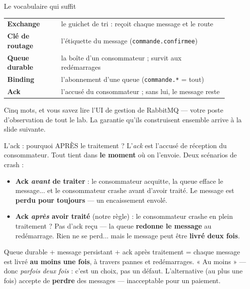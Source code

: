 \documentclass[aspectratio=169,11pt]{beamer}
\begin{document}
\begin{frame}{Le vocabulaire qui suffit}
{\small\begin{tabular}{p{0.22\linewidth}p{0.68\linewidth}}
\toprule
\textbf{Exchange} & le guichet de tri : reçoit chaque message et le route\\
\textbf{Clé de routage} & l'étiquette du message (\texttt{commande.confirmee})\\
\textbf{Queue durable} & la boîte d'un consommateur ; survit aux redémarrages\\
\textbf{Binding} & l'abonnement d'une queue (\texttt{commande.*} = tout)\\
\textbf{Ack} & l'accusé du consommateur ; sans lui, le message reste\\
\bottomrule
\end{tabular}}
\vskip4pt
\begin{ucadret}[À retenir]
{\small Cinq mots, et vous savez lire l'UI de gestion de RabbitMQ — votre poste d'observation de tout le lab. La garantie qu'ils construisent ensemble arrive à la slide suivante.}
\end{ucadret}
\end{frame}

\begin{frame}{L'ack : pourquoi APRÈS le traitement ?}
{\small L'\emph{ack} est l'accusé de réception du consommateur. Tout tient dans \textbf{le moment} où on l'envoie. Deux scénarios de crash :}
\begin{itemize}\small
  \item \textbf{Ack \emph{avant} de traiter} : le consommateur acquitte, la queue efface le message... et le consommateur crashe avant d'avoir traité. Le message est \textbf{perdu pour toujours} — un encaissement envolé.
  \item \textbf{Ack \emph{après} avoir traité} (notre règle) : le consommateur crashe en plein traitement ? Pas d'ack reçu — la queue \textbf{redonne le message} au redémarrage. Rien ne se perd... mais le message peut être \textbf{livré deux fois}.
\end{itemize}
\begin{ucaddef}
{\small Queue durable + message persistant + ack après traitement = chaque message est livré \textbf{au moins une fois}, à travers pannes et redémarrages. « Au moins » — donc \emph{parfois deux fois} : c'est un choix, pas un défaut. L'alternative (au plus une fois) accepte de \textbf{perdre} des messages — inacceptable pour un paiement.}
\end{ucaddef}
\end{frame}
\end{document}
